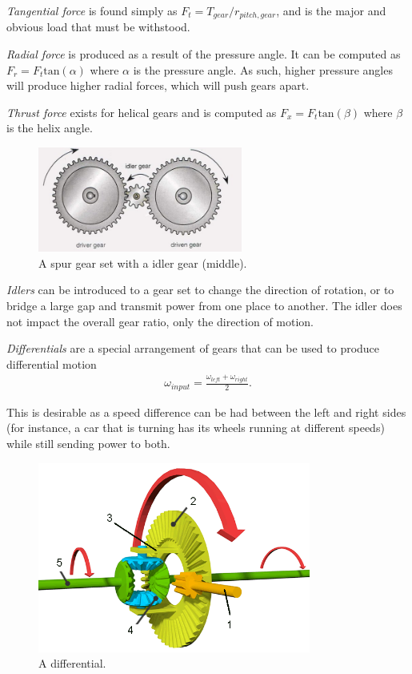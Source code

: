\begin{asparaenum}[a)]
	\item \textit{Tangential force} is found simply as $F_{t} = T_{gear} / r_{pitch, gear}$, and is the major and obvious load that must be withstood.
	\item \textit{Radial force} is produced as a result of the pressure angle. It can be computed as $F_{r} = F_{t} \text{tan}(\alpha)$ where $\alpha$ is the pressure angle. As such, higher pressure angles will produce higher radial forces, which will push gears apart.
	\item \textit{Thrust force} exists for helical gears and is computed as $F_{x} = F_{t} \text{tan}(\beta)$ where $\beta$ is the helix angle.
\end{asparaenum}

\begin{figure}[H]
	\includegraphics[width=0.6\textwidth]{imgs/gearset_idler.jpeg}
	\caption{A spur gear set with a idler gear (middle).}
\end{figure}

\textit{Idlers} can be introduced to a gear set to change the direction of rotation, or to bridge a large gap and transmit power from one place to another. The idler does not impact the overall gear ratio, only the direction of motion.

\textit{Differentials} are a special arrangement of gears that can be used to produce differential motion
\begin{align}
	\omega_{input} = \frac{\omega_{left} + \omega_{right}}{2} .
\end{align}

This is desirable as a speed difference can be had between the left and right sides (for instance, a car that is turning has its wheels running at different speeds) while still sending power to both.

\begin{figure}[H]
	\includegraphics[width=0.8\textwidth]{imgs/differential.png}
	\caption{A differential.}
\end{figure}

